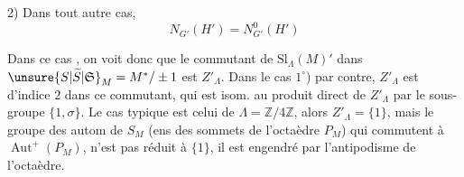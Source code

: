 2) Dans tout autre cas, 
\[
N_{G'}(H')=N^0_{G'}(H')\tag*{(55)}
\]

Dans ce cas , on voit donc que le commutant
de $\mathrm{Sl}_\Lambda(M)'$ dans $\unsure{S|\widetilde S|\mathfrak S}_M=M^*/\pm1$ est $Z'_\Lambda$.
Dans le cas $1^\circ$) par contre, $Z'_\Lambda$ est d'indice
$2$ dans ce commutant, qui est isom. au
produit direct  de $Z'_\Lambda$ par le sous-groupe
$\{1,\sigma\}$. Le cas typique est celui de
$\Lambda=\mathbb Z/4\mathbb Z$,  alors $Z'_\Lambda=\{1\}$,
mais le groupe des autom de $S_M$ (ens des
sommets de l'octaèdre $P_M$) qui commutent à
$\operatorname{Aut}^{+}(P_M)$, n'est pas réduit à $\{1\}$, il est engendré
par l'antipodisme de l'octaèdre.
